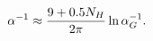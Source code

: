 \begin{equation}
 \alpha^{-1} \approx {9+0.5N_H\over 2\pi}\ln{\alpha_G^{-1}}.
 \label{eq:17}
 \end{equation}


